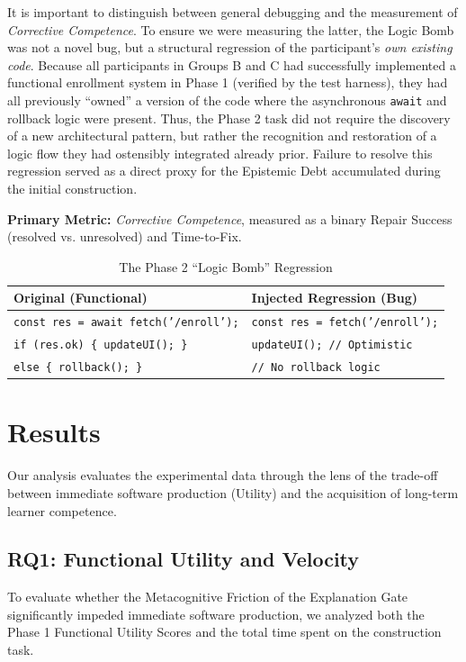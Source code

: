 \documentclass[sigconf]{acmart}
\begin{document}
It is important to distinguish between general debugging and the measurement of \textit{Corrective Competence}. To ensure we were measuring the latter, the Logic Bomb was not a novel bug, but a structural regression of the participant's \textit{own existing code}. Because all participants in Groups B and C had successfully implemented a functional enrollment system in Phase 1 (verified by the test harness), they had all previously ``owned'' a version of the code where the asynchronous \texttt{await} and rollback logic were present. Thus, the Phase 2 task did not require the discovery of a new architectural pattern, but rather the recognition and restoration of a logic flow they had ostensibly integrated already prior. Failure to resolve this regression served as a direct proxy for the Epistemic Debt accumulated during the initial construction.

\textbf{Primary Metric:} \textit{Corrective Competence}, measured as a binary Repair Success (resolved vs. unresolved) and Time-to-Fix.

\begin{table}[ht]
  \caption{The Phase 2 ``Logic Bomb'' Regression}
  \label{tab:logic_bomb}
  \small
  \begin{tabularx}{\columnwidth}{X|X}
    \toprule
    \textbf{Original (Functional)} & \textbf{Injected Regression (Bug)} \\
    \midrule
    \texttt{const res = await fetch('/enroll');} & \texttt{const res = fetch('/enroll');} \\
    \texttt{if (res.ok) \{ updateUI(); \}} & \texttt{updateUI(); // Optimistic} \\
    \texttt{else \{ rollback(); \}} & \texttt{// No rollback logic} \\
    \bottomrule
  \end{tabularx}
\end{table}

\section{Results}

Our analysis evaluates the experimental data through the lens of the trade-off between immediate software production (Utility) and the acquisition of long-term learner competence. 

\subsection{RQ1: Functional Utility and Velocity}
To evaluate whether the Metacognitive Friction of the Explanation Gate significantly impeded immediate software production, we analyzed both the Phase 1 Functional Utility Scores and the total time spent on the construction task.
\end{document}
